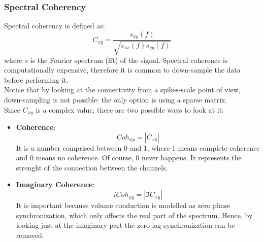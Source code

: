 \subsubsection{Spectral Coherency}
Spectral coherency is defined as:
\begin{equation*}
    C_{xy} = \frac{s_{xy}(f)}{\sqrt{s_{xx}(f)s_{yy}(f)}}
\end{equation*}
where \(s\) is the Fourier spectrum (fft) of the signal.
Spectral coherence is computationally expensive, therefore it is common to down-sample
the data before performing it.\\
Notice that by looking at the connectivity from a spikes-scale point of view,
down-sampling is not possible: the only option is using a sparse matrix.\\
Since \(C_{xy}\) is a complex value, there are two possible ways to look at it:
\begin{itemize}
    \item \textbf{Coherence}:
          \begin{equation*}
              Coh_{xy}=|C_{xy}|
          \end{equation*}
          It is a number comprised between 0 and 1, where 1 means complete coherence and 0
          means no coherence. Of course, 0 never happens. It represents the strenght of the
          connection between the channels.
    \item \textbf{Imaginary Coherence}:
          \begin{equation*}
              iCoh_{xy}=|\Im{C_{xy}}|
          \end{equation*}
          It is important because volume conduction is modelled as zero phase
          synchronization, which only affects the real part of the spectrum. Hence, by
          looking just at the imaginary part the zero lag synchronization can be removed.
\end{itemize}
